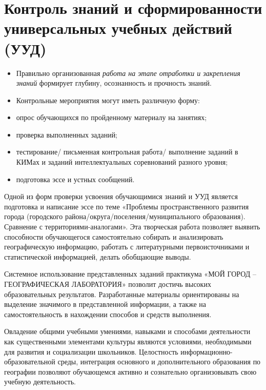 \documentclass[
  11pt,
]{book}
\begin{document}
\section*{Контроль знаний и сформированности универсальных учебных действий (УУД)}\label{ux43aux43eux43dux442ux440ux43eux43bux44c-ux437ux43dux430ux43dux438ux439-ux438-ux441ux444ux43eux440ux43cux438ux440ux43eux432ux430ux43dux43dux43eux441ux442ux438-ux443ux43dux438ux432ux435ux440ux441ux430ux43bux44cux43dux44bux445-ux443ux447ux435ux431ux43dux44bux445-ux434ux435ux439ux441ux442ux432ux438ux439-ux443ux443ux434}

\begin{itemize}
\item
  Правильно организованная \emph{работа на этапе отработки и закрепления знаний} формирует глубину, осознанность и прочность знаний.
\item
  Контрольные мероприятия могут иметь различную форму:
\item
  опрос обучающихся по пройденному материалу на занятиях;
\item
  проверка выполненных заданий;
\item
  тестирование/ письменная контрольная работа/ выполнение заданий в КИМах и заданий интеллектуальных соревнований разного уровня;
\item
  подготовка эссе и устных сообщений.
\end{itemize}

Одной из форм проверки усвоения обучающимися знаний и УУД является подготовка и написание эссе по теме «Проблемы пространственного развития города (городского района/округа/поселения/муниципального образования). Сравнение с территориями-аналогами». Эта творческая работа позволяет выявить способности обучающегося самостоятельно собирать и анализировать географическую информацию, работать с литературными первоисточниками и статистической информацией, делать обобщающие выводы.

Системное использование представленных заданий практикума «МОЙ ГОРОД -- ГЕОГРАФИЧЕСКАЯ ЛАБОРАТОРИЯ» позволит достичь высоких образовательных результатов. Разработанные материалы ориентированы на выделение значимого в представленной информации, а также на самостоятельность в нахождении способов и средств выполнения.

Овладение общими учебными умениями, навыками и способами деятельности как существенными элементами культуры являются условиями, необходимыми для развития и социализации школьников. Целостность информационно-образовательной среды, интеграция основного и дополнительного образования по географии позволяют обучающемся активно и сознательно организовывать свою учебную деятельность.
\end{document}
